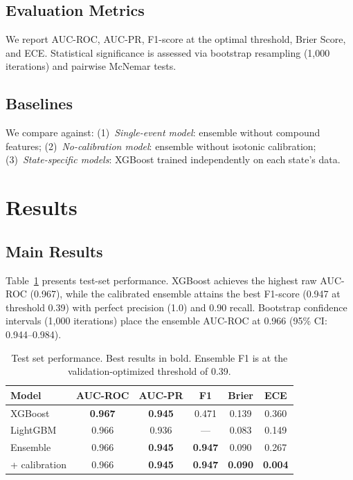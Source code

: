 \documentclass[conference]{IEEEtran}
\begin{document}
\subsection{Evaluation Metrics}

We report AUC-ROC, AUC-PR, F1-score at the optimal threshold, Brier Score, and ECE. Statistical significance is assessed via bootstrap resampling (1{,}000 iterations) and pairwise McNemar tests.

\subsection{Baselines}

We compare against: (1)~\textit{Single-event model}: ensemble without compound features; (2)~\textit{No-calibration model}: ensemble without isotonic calibration; (3)~\textit{State-specific models}: XGBoost trained independently on each state's data.

\section{Results}\label{sec:results}

\subsection{Main Results}

Table~\ref{tab:main} presents test-set performance. XGBoost achieves the highest raw AUC-ROC (0.967), while the calibrated ensemble attains the best F1-score (0.947 at threshold 0.39) with perfect precision (1.0) and 0.90 recall. Bootstrap confidence intervals (1{,}000 iterations) place the ensemble AUC-ROC at 0.966 (95\% CI: 0.944--0.984).

\begin{table}[t]
\centering
\caption{Test set performance. Best results in bold. Ensemble F1 is at the validation-optimized threshold of 0.39.}
\label{tab:main}
\begin{tabular}{@{}lccccc@{}}
\toprule
\textbf{Model} & \textbf{AUC-ROC} & \textbf{AUC-PR} & \textbf{F1} & \textbf{Brier} & \textbf{ECE} \\
\midrule
XGBoost & \textbf{0.967} & \textbf{0.945} & 0.471 & 0.139 & 0.360 \\
LightGBM & 0.966 & 0.936 & --- & 0.083 & 0.149 \\
\midrule
Ensemble & 0.966 & \textbf{0.945} & \textbf{0.947} & 0.090 & 0.267 \\
\quad + calibration & 0.966 & \textbf{0.945} & \textbf{0.947} & \textbf{0.090} & \textbf{0.004} \\
\bottomrule
\end{tabular}
\end{table}
\end{document}
